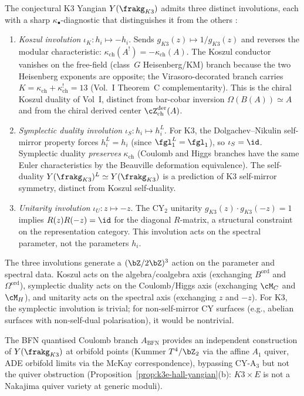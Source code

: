 \begin{remark}
\label{rem:k3-yangian-three-involutions}
The conjectural K3 Yangian $Y(\frakg_{K3})$ admits three distinct involutions,
each with a sharp $\kappa_\bullet$-diagnostic that distinguishes it from the others
:
\begin{enumerate}[label=\textup{(\roman*)}]
 \item \emph{Koszul involution} $\iota_K \colon h_i \mapsto -h_i$.
 Sends $g_{K3}(z) \mapsto 1/g_{K3}(z)$ and reverses the modular
 characteristic: $\kappa_{\mathrm{ch}}(A^!) = -\kappa_{\mathrm{ch}}(A)$.
 The Koszul conductor vanishes on the free-field (class~$G$
 Heisenberg/KM) branch because the two Heisenberg exponents are opposite;
 the Virasoro-decorated
 branch carries $K = \kappa_{\mathrm{ch}} + \kappa_{\mathrm{ch}}^! = 13$
 (Vol.~I Theorem~C complementarity).
 This is the chiral Koszul duality of Vol~I, distinct from bar-cobar inversion
 $\Omega(B(A)) \simeq A$ and from the chiral derived center
 $\cZ^{\mathrm{der}}_{\mathrm{ch}}(A)$.

 \item \emph{Symplectic duality involution} $\iota_S \colon h_i \mapsto h_i^L$.
 For K3, the Dolgachev--Nikulin self-mirror property forces
 $h_i^L = h_i$ (since $\fgl_1^L = \fgl_1$), so $\iota_S = \id$.
 Symplectic duality \emph{preserves} $\kappa_{\mathrm{ch}}$ (Coulomb
 and Higgs branches have the same Euler characteristics by
 the Beauville deformation equivalence). The self-duality
 $Y(\frakg_{K3})^L \simeq Y(\frakg_{K3})$ is a prediction of
 K3 self-mirror symmetry, distinct from Koszul self-duality.

 \item \emph{Unitarity involution} $\iota_U \colon z \mapsto -z$.
 The CY$_2$ unitarity $g_{K3}(z) \cdot g_{K3}(-z) = 1$
 implies $R(z) R(-z) = \id$ for the diagonal $R$-matrix,
 a structural constraint on the representation category.
 This involution acts on the spectral parameter, not the
 parameters $h_i$.
\end{enumerate}
The three involutions generate a $(\bZ/2\bZ)^3$ action on the parameter
and spectral data. Koszul acts on the algebra/coalgebra axis (exchanging
$B^{\mathrm{ord}}$ and $\Omega^{\mathrm{ord}}$), symplectic duality acts on the
Coulomb/Higgs axis (exchanging $\cM_C$ and $\cM_H$), and unitarity acts
on the spectral axis (exchanging $z$ and $-z$). For K3, the symplectic
involution is trivial; for non-self-mirror CY surfaces (e.g., abelian
surfaces with non-self-dual polarisation), it would be nontrivial.

The BFN quantised Coulomb branch $A_{\mathrm{BFN}}$ provides an independent
construction of $Y(\frakg_{K3})$ at orbifold points (Kummer $T^4/\bZ_2$
via the affine $A_1$ quiver, ADE orbifold limits via the McKay
correspondence), bypassing CY-A$_3$ but not the quiver obstruction
(Proposition~\ref{prop:k3e-hall-yangian}(b): $K3 \times E$ is not a
Nakajima quiver variety at generic moduli).
\end{remark}

